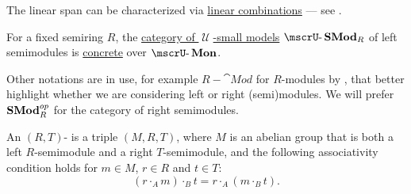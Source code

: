 \begin{definition}
\begin{thmenum}[resume=def:semimodule]
    The linear span can be characterized via \hyperref[rem:linear_combinations]{linear combinations} --- see .

     For a fixed semiring \( R \), the \hyperref[def:category_of_small_first_order_models]{category of \( \mscrU \)-small models} \( \ucat{SMod}_R \) of left semimodules is \hyperref[def:concrete_category]{concrete} over \hyperref[def:monoid]{\( \ucat{Mon} \)}.

    Other notations are in use, for example \( R-\cat{Mod} \) for \( R \)-modules by , that better highlight whether we are considering left or right (semi)modules. We will prefer \( \operatorname{\mathbf{SMod}}_R^{op} \) for the category of right semimodules.

     An \( (R, T) \)- is a triple \( (M, R, T) \), where \( M \) is an abelian group that is both a left \( R \)-semimodule and a right \( T \)-semimodule, and the following associativity condition holds for \( m \in M \), \( r \in R \) and \( t \in T \):
    \begin{equation}\label{eq:def:semimodule/bisemimodule/associativity}
      (r \cdot_A m) \cdot_B t = r \cdot_A (m \cdot_B t).
    \end{equation}
  \end{thmenum}
\end{definition}

